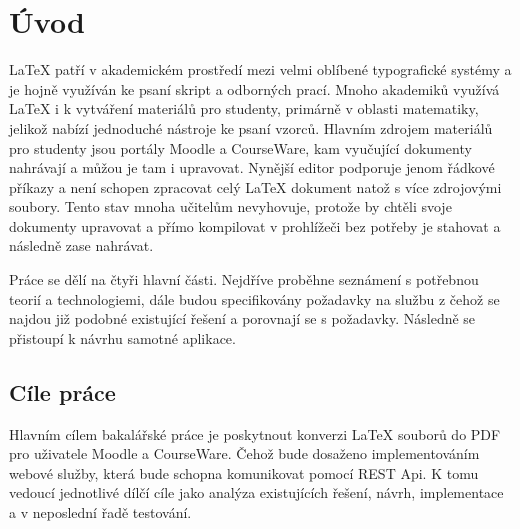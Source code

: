 \chapter{Úvod}
LaTeX patří v akademickém prostředí mezi velmi oblíbené typografické systémy a je hojně využíván ke psaní skript a odborných prací. Mnoho akademiků využívá LaTeX i k vytváření materiálů pro studenty, primárně v oblasti matematiky, jelikož nabízí jednoduché nástroje ke psaní vzorců. Hlavním zdrojem materiálů pro studenty jsou portály Moodle a CourseWare, kam vyučující dokumenty nahrávají a můžou je tam i upravovat. Nynější editor podporuje jenom řádkové příkazy a není schopen zpracovat celý LaTeX dokument natož s více zdrojovými soubory. Tento stav mnoha učitelům nevyhovuje, protože by chtěli svoje dokumenty upravovat a přímo kompilovat v prohlížeči bez potřeby je stahovat a následně zase nahrávat. 

Práce se dělí na čtyři hlavní části. Nejdříve proběhne seznámení s potřebnou teorií a technologiemi, dále budou specifikovány požadavky na službu z čehož se najdou již podobné existující řešení a porovnají se s požadavky. Následně se přistoupí k návrhu samotné aplikace.


\section{Cíle práce}
Hlavním cílem bakalářské práce je poskytnout konverzi LaTeX souborů do PDF pro uživatele Moodle a CourseWare. Čehož bude dosaženo implementováním webové služby, která bude schopna komunikovat pomocí REST Api. K tomu vedoucí jednotlivé dílčí cíle jako analýza existujících řešení, návrh, implementace a v neposlední řadě testování. 
